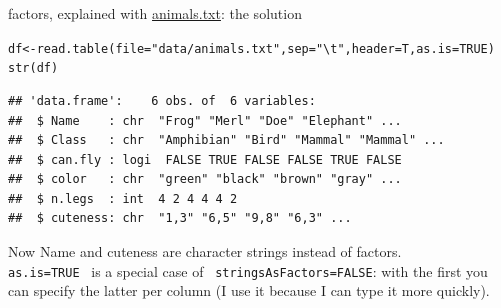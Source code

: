\documentclass[xcolor=table,           xcolor=dvipsnames]{beamer}\usepackage[]{graphicx}\usepackage[]{color}
\makeatletter
\newcommand{\hlnum}[1]{\textcolor[rgb]{0,0,0}{#1}}
\newcommand{\hlstr}[1]{\textcolor[rgb]{0.545,0.137,0.137}{#1}}
\newcommand{\hlstd}[1]{\textcolor[rgb]{0,0,0}{#1}}
\newcommand{\hlkwb}[1]{\textcolor[rgb]{0,0,0}{#1}}
\newcommand{\hlkwc}[1]{\textcolor[rgb]{1,0,1}{#1}}
\newcommand{\hlkwd}[1]{\textcolor[rgb]{0,0,1}{#1}}
\newenvironment{kframe}{%
 \def\at@end@of@kframe{}%
 \ifinner\ifhmode%
  \def\at@end@of@kframe{\end{minipage}}%
  \begin{minipage}{\columnwidth}%
 \fi\fi%
 \def\FrameCommand##1{\hskip\@totalleftmargin \hskip-\fboxsep
 \colorbox{shadecolor}{##1}\hskip-\fboxsep
     \hskip-\linewidth \hskip-\@totalleftmargin \hskip\columnwidth}%
 \MakeFramed {\advance\hsize-\width
   \@totalleftmargin\z@ \linewidth\hsize
   \@setminipage}}%
 {\par\unskip\endMakeFramed%
 \at@end@of@kframe}
\newenvironment{knitrout}{}{} %
\newcommand{\datalink}[1]{\href{https://dl.dropboxusercontent.com/u/4836866/R_course_Berry/data/#1?dl=1}{#1}}
\makeatother
\begin{document}

\begin{frame}[fragile]{factors, explained with \datalink{animals.txt}: the solution}
\vspace{-0.9em} \pause
\begin{knitrout}\footnotesize
{}\color{fgcolor}\begin{kframe}
\begin{alltt}
\hlstd{df} \hlkwb{<-} \hlkwd{read.table}\hlstd{(}\hlkwc{file}\hlstd{=}\hlstr{"data/animals.txt"}\hlstd{,} \hlkwc{sep}\hlstd{=}\hlstr{"\textbackslash{}t"}\hlstd{,} \hlkwc{header}\hlstd{=T,} \hlkwc{as.is}\hlstd{=}\hlnum{TRUE}\hlstd{)}
\hlkwd{str}\hlstd{(df)}
\end{alltt}
\begin{verbatim}
## 'data.frame':	6 obs. of  6 variables:
##  $ Name    : chr  "Frog" "Merl" "Doe" "Elephant" ...
##  $ Class   : chr  "Amphibian" "Bird" "Mammal" "Mammal" ...
##  $ can.fly : logi  FALSE TRUE FALSE FALSE TRUE FALSE
##  $ color   : chr  "green" "black" "brown" "gray" ...
##  $ n.legs  : int  4 2 4 4 4 2
##  $ cuteness: chr  "1,3" "6,5" "9,8" "6,3" ...
\end{verbatim}
\end{kframe}
\end{knitrout}
Now Name and cuteness are character strings instead of factors.\\
\texttt{as.is=TRUE}~ is a special case of ~\texttt{stringsAsFactors=FALSE}: with the first you can specify the latter per column (I use it because I can type it more quickly).
\end{frame}

\end{document}
